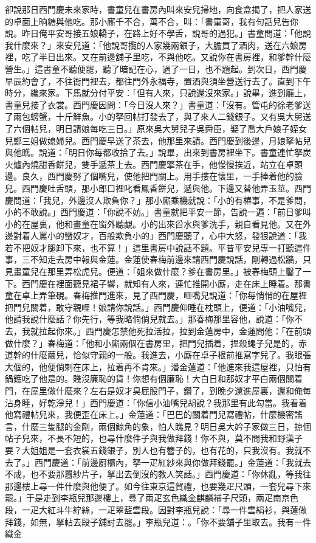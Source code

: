 \begin{showcontents}{}
卻說那日西門慶未來家時，書童兒在書房內叫來安兒掃地，向食盒揭了，把人家送的卓面上晌糖與他吃。那小廝千不合，萬不合，叫：「書童哥，我有句話兒告你說。昨日俺平安哥接五娘轎子，在路上好不學舌，說哥的過犯。」書童問道：「他說我什麼來？」來安兒道：「他說哥攬的人家幾兩銀子，大膽買了酒肉，送在六娘房裡，吃了半日出來。又在前邊舖子里吃，不與他吃。又說你在書房裡，和爹幹什麼營生。」這書童不聽便罷，聽了暗記在心，過了一日，也不題起。到次日，西門慶早辰約會了，不往衙門裡去，都往門外永福寺，置酒與須坐營送行去了。直到下午時分，纔來家。下馬就分付平安：「但有人來，只說還沒來家。」說畢，進到廳上，書童兒接了衣裳。西門慶因問：「今日沒人來？」書童道：「沒有。管屯的徐老爹送了兩包螃蟹，十斤鮮魚。小的拏回帖打發去了，與了來人二錢銀子。又有吳大舅送了六個帖兒，明日請娘每吃三日。」原來吳大舅兒子吳舜臣，娶了喬大戶娘子姪女兒鄭三姐做媳婦兒。西門慶早送了茶去，他那里來請。西門慶到後邊，月娘拏帖兒與他瞧。說道：「明日你每都收拾了去。」說畢，出來到書房裡坐下。書童連忙拏炭火爐內燒甜香餅兒，雙手遞茶上去。西門慶擎茶在手，他慢慢挨近，站立在卓頭邊。良久，西門慶努了個嘴兒，使他把門關上。用手摟在懷里，一手捧着他的臉兒。西門慶吐舌頭，那小郎口裡叱看鳳香餅兒，遞與他。下邊又替他弄玉莖。西門慶問道：「我兒，外邊沒人欺負你？」那小廝乘機就說：「小的有樁事，不是爹問，小的不敢說。」西門慶道：「你說不妨。」書童就把平安一節，告說一遍：「前日爹叫小的在屋裏，他和畫童在窗外聽覷。小的出來舀水與爹洗手，親自看見他。又在外邊對着人罵小的蠻奴才，百般欺負小的」西門慶聽了，心中大怒，發狠說道：「我若不把奴才腿卸下來，也不算！」這里書房中說話不題。平昔平安兒專一打聽這件事，三不知走去房中報與金蓮。金蓮使春梅前邊來請西門慶說話，剛轉過松牆，只見畫童兒在那里弄松虎兒。便道：「姐來做什麼？爹在書房里。」被春梅頭上鑿了一下。西門慶在裡面聽見裙子響，就知有人來，連忙推開小廝，走在床上睡着。那書童在卓上弄筆硯。春梅推門進來，見了西門慶，咂嘴兒說道：「你每悄悄的在屋裡把門兒關着，敢守親哩！娘請你說話。」西門慶仰睡在枕頭上，便道：「小油嘴兒，他請我說什麼話？你先行，等我略倘倘兒就去。」那春梅那里容他，說道：「你不去，我就拉起你來。」西門慶怎禁他死拉活拉，拉到金蓮房中，金蓮問他：「在前頭做什麼？」春梅道：「他和小廝兩個在書房里，把門兒插着，捏殺蠅子兒是的，赤道幹的什麼繭兒，恰似守親的一般。我進去，小廝在卓子根前推寫字兒了。我眼張大個的，他便倘刺在床上，拉着再不肯來。」潘金蓮道：「他進來我這屋裡，只怕有鍋鑊吃了他是的。賤沒廉恥的貨！你想有個廉恥！大白日和那奴才平白兩個關着門，在屋里做什麼來？左右是奴才臭屁股門子，鑽了，到晚夕還進屋裏，還和俺每沾身睡，好乾淨兒！」西門慶道：「你信小油嘴兒胡說？我那里有此勾當。我看着他寫禮帖兒來，我便歪在床上。」金蓮道：「巴巴的關着門兒寫禮帖，什麼機密謠言，什麼三隻腿的金剛，兩個鯨角的象，怕人瞧見？明日吳大妗子家做三日，掠個帖子兒來，不長不短的，也尋什麼件子與我做拜錢！你不與，莫不問我和野漢子要？大姐姐是一套衣裳五錢銀子，別人也有簪子的，也有花的，只我沒有。我就不去了。」西門慶道：「前邊廚櫃內，拏一疋紅紗來與你做拜錢罷。」金蓮道：「我就去不成，也不要那囂紗片子，拏出去倒沒的教人笑話。」西門慶道：「你休亂，等我往那邊樓上尋一件什麼與他便了。如今往東京這賀禮，也要幾疋尺頭，一套兒尋下來罷。」于是走到李瓶兒那邊樓上，尋了兩疋玄色織金麒麟補子尺頭，兩疋南京色段，一疋大紅斗牛紵絲，一疋翠藍雲段。因對李瓶兒說：「尋一件雲絹衫，與蓮做拜錢，如無，拏帖去段子舖討去罷。」李瓶兒道：。「你不要舖子里取去。我有一件織金
\end{showcontents}

